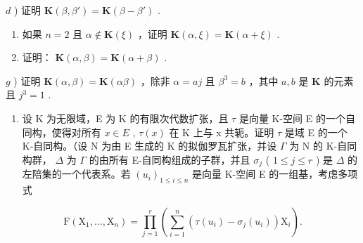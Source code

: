 \(d\) ) 证明 \(\mathbf{K}(\beta, \beta') = \mathbf{K}(\beta - \beta')\) .

\begin{enumerate}
\def\labelenumi{\alph{enumi})}
\setcounter{enumi}{4}
\item
  如果 \(n = 2\) 且 \(\alpha \notin \mathbf{K}(\xi)\) ，证明 \(\mathbf{K}(\alpha, \xi) = \mathbf{K}(\alpha + \xi)\) .
\item
  证明： \(\mathbf{K}(\alpha, \beta) = \mathbf{K}(\alpha + \beta)\) .
\end{enumerate}

\(g\) ) 证明 \(\mathbf{K}(\alpha ,\beta) = \mathbf{K}(\alpha \beta)\) ，除非 \(\alpha = aj\) 且 \(\beta^3 = b\) ，其中 \(a,b\) 是 \(\mathbf{K}\) 的元素且 \(j^3 = 1\) .

\begin{enumerate}
\def\labelenumi{\arabic{enumi})}
\setcounter{enumi}{7}
\tightlist
\item
  设 K 为无限域，E 为 K 的有限次代数扩张，且 \(\tau\) 是向量 K-空间 E 的一个自同构，使得对所有 \(x \in E\) , \(\tau(x)\) 在 K 上与 x 共轭。证明 \(\tau\) 是域 E 的一个 K-自同构。（设 N 为由 E 生成的 K 的拟伽罗瓦扩张，并设 \(\Gamma\) 为 N 的 K-自同构群， \(\Delta\) 为 \(\Gamma\) 的由所有 E-自同构组成的子群，并且 \(\sigma_{j}\) ( \(1 \leqslant j \leqslant r\) ) 是 \(\Delta\) 的左陪集的一个代表系。若 \((u_{i})_{1 \leqslant i \leqslant n}\) 是向量 K-空间 E 的一组基，考虑多项式
\end{enumerate}

\[
\mathrm{F} \left(\mathrm{X} _ {1}, \dots , \mathrm{X} _ {n}\right) = \prod_ {j = 1} ^ {r} \left(\sum_ {i = 1} ^ {n} \left(\tau \left(u _ {i}\right) - \sigma_ {j} \left(u _ {i}\right)\right) \mathrm{X} _ {i}\right).
\]

